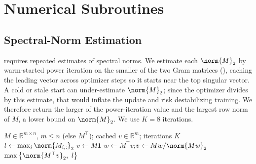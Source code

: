 \section{Numerical Subroutines}
\label{app:primitives}

\subsection{Spectral-Norm Estimation}
\label{app:smax}
 requires repeated estimates of spectral norms.  
We estimate each $\norm{M}_2$ by warm-started power iteration on the smaller of
the two Gram matrices (), caching the leading vector across
optimizer steps so it starts near the top singular vector.  A cold or stale start
can under-estimate $\norm{M}_2$; since the optimizer divides by this estimate,
that would inflate the update and risk destabilizing training.  We therefore
return the larger of the power-iteration value and the largest row norm of $M$, a
lower bound on $\norm{M}_2$.  We use $K=8$ iterations.

\begin{algorithm}[ht]
\caption{Guarded spectral-norm estimate of $\norm{M}_2$}
\label{alg:smax}
\begin{algorithmic}[1]
\Require $M\in\mathbb{R}^{m\times n}$, $m\le n$ (else $M^\top$); cached $v\in\mathbb{R}^m$; iterations $K$
\State $l \gets \max_i\norm{M_{i,:}}_2$
 \State $v\gets M\mathbf{1}$  \EndIf
{} 
  \State $w\gets M^\top v$;\quad $v\gets Mw/\norm{Mw}_2$
\EndFor
\State \Return $\max\big\{\norm{M^\top v}_2,\ l\big\}$
\end{algorithmic}
\end{algorithm}